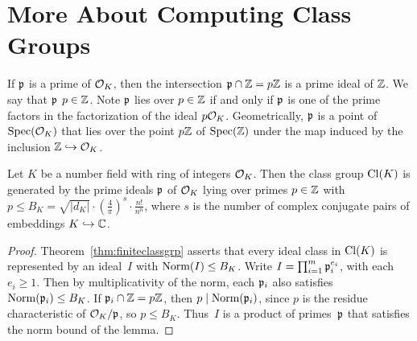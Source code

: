 
  

\section{More About Computing Class Groups}\label{sec:comcg}
If $\mathfrak{p}$ is a prime of $\mathcal{O}_K$, then the intersection $\mathfrak{p}\cap \mathbb{Z}=p\mathbb{Z}$ is
a prime ideal of $\mathbb{Z}$.  We say that $\mathfrak{p}$  $p\in\mathbb{Z}$.
Note $\mathfrak{p}$ lies over $p\in\mathbb{Z}$ if and only if $\mathfrak{p}$ is one of the prime
factors in the factorization of the ideal $p\mathcal{O}_K$.  Geometrically,
$\mathfrak{p}$ is a point of $\operatorname{Spec}(\mathcal{O}_K)$ that lies over the point $p\mathbb{Z}$ of
$\operatorname{Spec}(\mathbb{Z})$ under the map induced by the inclusion $\mathbb{Z}\hookrightarrow \mathcal{O}_K$.


\begin{lemma}
Let $K$ be a number field with ring of integers $\mathcal{O}_K$.  Then the
class group $\operatorname{Cl}(K)$ is generated by the prime ideals $\mathfrak{p}$ of $\mathcal{O}_K$
lying over primes $p\in\mathbb{Z}$ with $p\leq B_K = \sqrt{|d_K|}\cdot
\left(\frac{4}{\pi}\right)^s\cdot \frac{n!}{n^n}$,
where $s$ is the number of complex conjugate pairs of embeddings
$K\hookrightarrow\mathbb{C}$.
\end{lemma}
\begin{proof}
Theorem~\ref{thm:finiteclassgrp} 
asserts that every ideal class in $\operatorname{Cl}(K)$ is represented by
an ideal~$I$ with $\operatorname{Norm}(I)\leq B_K$.  Write $I=\prod_{i=1}^m
\mathfrak{p}_i^{e_i}$, with each $e_i\geq 1$.  Then by multiplicativity of the
norm, each $\mathfrak{p}_i$ also satisfies $\operatorname{Norm}(\mathfrak{p}_i)\leq B_K$.  If $\mathfrak{p}_i \cap
\mathbb{Z}=p\mathbb{Z}$, then $p\mid \operatorname{Norm}(\mathfrak{p}_i)$, since $p$ is the residue
characteristic of $\mathcal{O}_K/\mathfrak{p}$, so $p\leq B_K$. Thus~$I$ is a product of
primes~$\mathfrak{p}$ that satisfies the norm bound of the lemma.
\end{proof}

